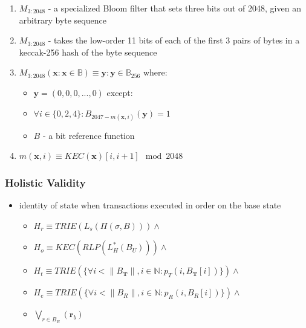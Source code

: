\documentclass{article}
\begin{document}
\begin{itemize}
\begin{enumerate}
\begin{enumerate}
\begin{enumerate}
\begin{enumerate}
                    \item $M_{3:2048}$ - a specialized Bloom filter that sets three bits out of 2048, given an arbitrary byte sequence
                    \item $M_{3:2048}$ - takes the low-order 11 bits of each of the first 3 pairs of bytes in a keccak-256 hash of the byte sequence
                    \item $M_{3:2048}(\textbf{x} : \textbf{x} \in \mathbb{B})  \equiv \textbf{y} : \textbf{y} \in \mathbb{B}_{256}$ where:
                    \begin{itemize}
                        \item $\textbf{y} = (0,0,0,...,0)$ except:
                        \item $\forall i \in \{0,2,4\} : B_{2047-m(\textbf{x},i)}(\textbf{y}) = 1$
                        \item $B$ - a bit reference function
                    \end{itemize}
                    \item ${m(\textbf{x},i) \equiv KEC(\textbf{x})[i,i+1] \mod 2048}$ 
                \end{enumerate}
            \end{enumerate} 
        \end{enumerate}
    \end{enumerate}
\end{itemize}

\subsubsection{Holistic Validity}

\begin{itemize}
    \item identity of state when transactions executed in order on the base state
    \begin{itemize}
        \item $H_r \equiv TRIE(L_s(\Pi(\sigma,B))) \land$
        \item $H_o \equiv KEC(RLP(L_H^*(B_U))) \land$
        \item $H_t \equiv TRIE(\{\forall i < \| B_{\textbf{T}} \|, i \in \mathbb{N} : p_T(i, B_{\textbf{T}}[i])\}) \land$ 
        \item $H_e \equiv TRIE(\{\forall i< \|B_R\|, i \in \mathbb{N} :  p_R(i, B_R[i])\}) \land$ 
        \item $\bigvee _{r \in B_R}(\textbf{r}_b)$
        
    \end{itemize}
\end{itemize}
\end{document}
